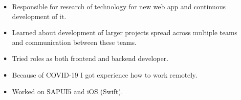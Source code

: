 \documentclass[10pt,a4paper,ragged2e,dvipsnames]{altacv}
\begin{document}

    \begin{fullwidth}
      \makecvheader
    \end{fullwidth}



    \begin{itemize}
      \item Responsible for research of technology for new web app and continuous development of it.
      \item Learned about development of larger projects spread across multiple
      teams and communication between these teams.
      \item Tried roles as both frontend and backend developer.
      \item Because of COVID-19 I got experience how to work remotely.
    \end{itemize}

    \divider

    \begin{itemize}
      \item Worked on SAPUI5 and iOS (Swift).
    \end{itemize}
\end{document}
